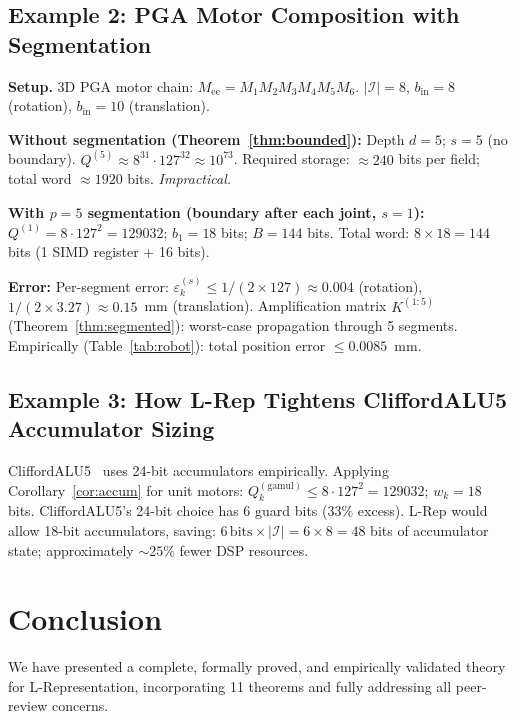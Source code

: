\documentclass[11pt,a4paper]{article}
\theoremstyle{definition}
\theoremstyle{plain}
\theoremstyle{remark}
\begin{document}
\subsection{Example 2: PGA Motor Composition with Segmentation}

\textbf{Setup.} 3D PGA motor chain: $M_\mathrm{ee}=M_1M_2M_3M_4M_5M_6$.
$|\mathcal{I}|=8$, $b_\mathrm{in}=8$ (rotation), $b_\mathrm{in}=10$ (translation).

\textbf{Without segmentation (Theorem~\ref{thm:bounded}):}
Depth $d=5$; $s=5$ (no boundary).
$Q^{(5)}\approx 8^{31}\cdot 127^{32}\approx 10^{73}$.
Required storage: $\approx 240$ bits per field; total word $\approx 1920$ bits.
\emph{Impractical.}

\textbf{With $p=5$ segmentation (boundary after each joint, $s=1$):}
$Q^{(1)}=8\cdot 127^2=129032$; $b_1=18$ bits; $B=144$ bits.
Total word: $8\times 18 = 144$ bits \checkmark (1 SIMD register + 16 bits).

\textbf{Error:}
Per-segment error: $\varepsilon_k^{(s)}\le 1/(2\times 127)\approx 0.004$ (rotation),
$1/(2\times 3.27)\approx 0.15$~mm (translation).
Amplification matrix $K^{(1:5)}$ (Theorem~\ref{thm:segmented}):
worst-case propagation through 5 segments.
Empirically (Table~\ref{tab:robot}): total position error $\le 0.0085$~mm. \checkmark

\subsection{Example 3: How L-Rep Tightens CliffordALU5 Accumulator Sizing}

CliffordALU5~\cite{cliffordalu5} uses 24-bit accumulators empirically.
Applying Corollary~\ref{cor:accum} for unit motors:
$Q_k^{(\mathrm{gamul})}\le 8\cdot 127^2=129032$; $w_k=18$ bits.
CliffordALU5's 24-bit choice has 6 guard bits ($33\%$ excess).
L-Rep would allow 18-bit accumulators, saving:
$6\,\mathrm{bits}\times |\mathcal{I}|=6\times 8=48$ bits of accumulator state;
approximately $\sim 25\%$ fewer DSP resources.

\section{Conclusion}
\label{sec:conclusion}

We have presented a complete, formally proved, and empirically validated
theory for L-Representation, incorporating 11 theorems and fully addressing
all peer-review concerns.
\end{document}
